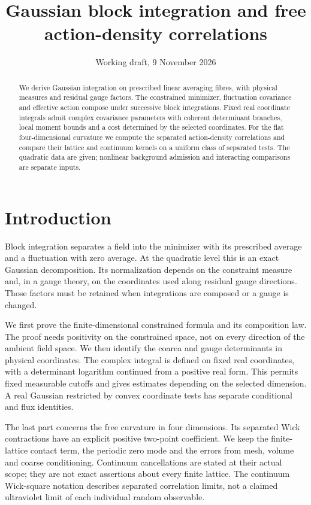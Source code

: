 \documentclass[11pt,letterpaper,reqno]{amsart}
\title[Gaussian block integration]{Gaussian block integration and free action-density correlations}
\date{Working draft, 9 November 2026}
\numberwithin{equation}{section}
\theoremstyle{definition}
\theoremstyle{remark}
\begin{document}
\raggedbottom
\begin{abstract}
We derive Gaussian integration on prescribed linear averaging fibres,
with physical measures and residual gauge factors. The constrained
minimizer, fluctuation covariance and effective action compose under
successive block integrations. Fixed real coordinate integrals admit
complex covariance parameters with coherent determinant branches,
local moment bounds and a cost determined by the selected coordinates.
For the flat four-dimensional curvature we compute the separated
action-density correlations and compare their lattice and continuum
kernels on a uniform class of separated tests. The quadratic data are
given; nonlinear background admission and interacting comparisons are
separate inputs.
\end{abstract}
\maketitle
\tableofcontents

\section{Introduction}

Block integration separates a field into the minimizer with its
prescribed average and a fluctuation with zero average. At the
quadratic level this is an exact Gaussian decomposition. Its
normalization depends on the constraint measure and, in a gauge
theory, on the coordinates used along residual gauge directions.
Those factors must be retained when integrations are composed or a
gauge is changed.

We first prove the finite-dimensional constrained formula and its
composition law. The proof needs positivity on the constrained
space, not on every direction of the ambient field space. We then
identify the coarea and gauge determinants in physical coordinates.
The complex integral is defined on fixed real coordinates, with a
determinant logarithm continued from a positive real form. This
permits fixed measurable cutoffs and gives estimates depending on
the selected dimension. A real Gaussian restricted by convex
coordinate tests has separate conditional and flux identities.

The last part concerns the free curvature in four dimensions.
Its separated Wick contractions have an explicit positive
two-point coefficient. We keep the finite-lattice contact term,
the periodic zero mode and the errors from mesh, volume and
coarse conditioning. Continuum cancellations are stated at their
actual scope; they are not exact assertions about every finite
lattice. The continuum Wick-square notation describes separated
correlation limits, not a claimed ultraviolet limit of each
individual random observable.
\end{document}
